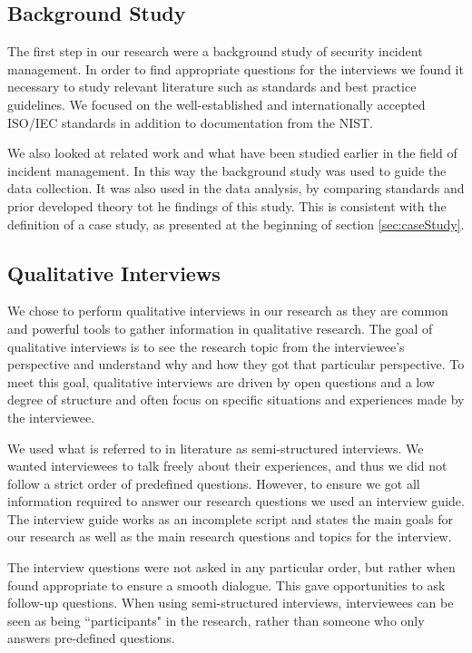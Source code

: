 \subsection{Background Study}
\label{sec:background}
The first step in our research were a background study of security incident management. In order to find appropriate questions for the interviews we found it necessary to study relevant literature such as standards and best practice guidelines. We focused on the well-established and internationally accepted ISO/IEC standards in addition to documentation from the \ac{NIST}.

We also looked at related work and what have been studied earlier in the field of incident management. In this way the background study was used to guide the data collection. It was also used in the data analysis, by comparing standards and prior developed theory tot he findings of this study. This is consistent with the definition of a case study, as presented at the beginning of section \ref{sec:caseStudy}.

\subsection{Qualitative Interviews}
\label{sec:interviews}
We chose to perform qualitative interviews in our research as they are common and powerful tools to gather information in qualitative research\cite{myers2007qualitative}. The goal of qualitative interviews is to see the research topic from the interviewee's perspective and understand why and how they got that particular perspective\cite{cassell2004essential}. To meet this goal, qualitative interviews are driven by open questions and a low degree of structure and often focus on specific situations and experiences made by the interviewee. 

We used what is referred to in literature as semi-structured interviews\cite{cassell2004essential}. We wanted interviewees to talk freely about their experiences, and thus we did not follow a strict order of predefined questions. However, to ensure we got all information required to answer our research questions we used an interview guide. The interview guide works as an incomplete script and states the main goals for our research as well as the main research questions and topics for the interview.

The interview questions were not asked in any particular order, but rather when found appropriate to ensure a smooth dialogue. This gave opportunities to ask follow-up questions. When using semi-structured interviews, interviewees can be seen as being ``participants" in the research, rather than someone who only answers pre-defined questions.

